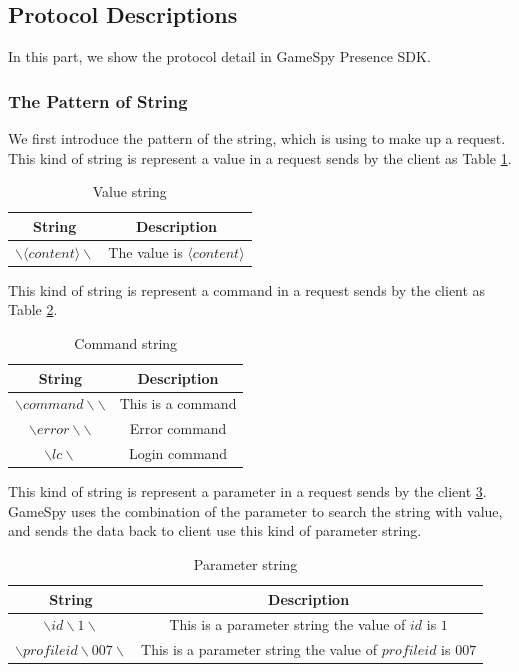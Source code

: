 \documentclass[oneside,titlepage,a4paper]{report} %
\begin{document}
\subsection{Protocol Descriptions}

In this part, we show the protocol detail in GameSpy Presence SDK.
\subsubsection{The Pattern of String}
We first introduce the pattern of the string, which is using to make up a request.
This kind of string is represent a value in a request sends by the client as Table \ref{Value string}.

\begin{table}[H]
	\centering
	\begin{tabular}{|c|c|}
		\hline 
		String&Description  \\ 
		\hline 
	$ \backslash \langle content \rangle \backslash $& The value is $ \langle content \rangle $  \\ 
		\hline 
	\end{tabular} 
\caption{Value string}
\label{Value string}
\end{table}

This kind of string is represent a command in a request sends by the client as Table \ref{Command string}.


\begin{table}[H]
	\centering
	\begin{tabular}{|c|c|}
		\hline 
		String&Description  \\ 
		\hline 
		$ \backslash command \backslash\backslash $& This is a command \\ 		
		\hline 
		$ \backslash error \backslash \backslash $ & Error command \\
		 \hline
		 $\backslash lc \backslash$& Login command\\
		 \hline
	\end{tabular} 
	\caption{Command string}
	\label{Command string}
\end{table}

This kind of string is represent a parameter in a request sends by the client \ref{Parameter string}. GameSpy uses the combination of the parameter to search the string with value, and sends the data back to client use this kind of parameter string.

\begin{table}[H]
	\centering
	\begin{tabular}{|c|c|}
		\hline 
		String&Description  \\ 
		\hline 
		$ \backslash id \backslash 1 \backslash $& This is a parameter string the value of $ id $ is $ 1 $ \\ 		
		\hline 
		$ \backslash profileid \backslash 007 \backslash $ & This is a parameter string the value of $ profileid $ is $ 007 $ \\
		\hline
	\end{tabular} 
	\caption{Parameter string}
	\label{Parameter string}
\end{table}
\end{document}
